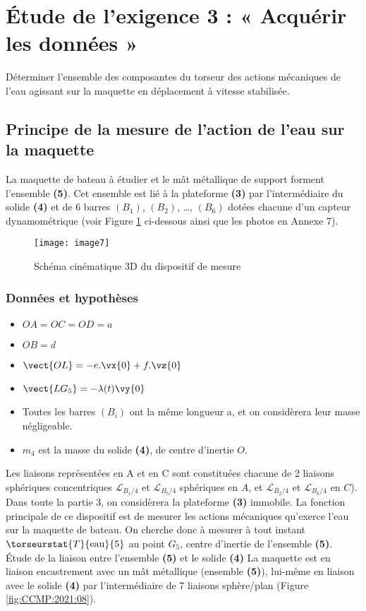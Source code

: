 \section{Étude de l'exigence 3 : « Acquérir les données »}
\begin{obj}
Déterminer l'ensemble des composantes du torseur des actions mécaniques de l'eau agissant sur la maquette en déplacement à vitesse stabilisée.
\end{obj}
\subsection{Principe de la mesure de l’action de l’eau sur la maquette}
La maquette de bateau à étudier et le mât métallique de support forment l’ensemble \textbf{\textbf{(5)}}. Cet ensemble est lié à la plateforme \textbf{(3)} par l’intermédiaire du solide \textbf{(4)} et de 6 barres 
$(B_1)$, $(B_2)$, …, $(B_6)$ dotées chacune d’un capteur dynamométrique (voir Figure \ref{fig:CCMP:2021:07} ci-dessous ainsi que les photos en Annexe 7).
 
\begin{figure}[!h]
\centering
\texttt{[image: image7]}
\caption{ \label{fig:CCMP:2021:07} Schéma cinématique 3D du dispositif de mesure}
\end{figure} 

\subsubsection*{Données et hypothèses}
 \begin{itemize}
 \item $OA=OC=OD=a$
 \item $OB=d$
 \item $\vect{OL}=-e.\vx{0}+f.\vz{0}$
 \item $\vect{LG_5}=-\lambda (t) \vy{0}$
 \item Toutes les barres $(B_i)$ ont la même longueur a, et on considèrera leur masse négligeable.
 \item $m_4$ est la masse du solide \textbf{(4)}, de centre d’inertie $O$.
\end{itemize} 

Les liaisons représentées en A et en C sont constituées chacune de 2 liaisons sphériques concentriques $\mathcal{L}_{B_1/4}$ et $\mathcal{L}_{B_5/4}$ sphériques en $A$, et $\mathcal{L}_{B_2/4}$ et $\mathcal{L}_{B_6/4}$ en $C$).
Dans toute la partie 3, on considèrera la plateforme \textbf{(3)} immobile.
La fonction principale de ce dispositif est de mesurer les actions mécaniques qu’exerce l’eau sur la maquette de bateau. On cherche donc à mesurer à tout instant $\torseurstat{T}{\text{eau}}{5}$ au point $G_5$, centre d’inertie de l’ensemble \textbf{(5)}.
Étude de la liaison entre l’ensemble \textbf{(5)} et le solide \textbf{(4)}
La maquette est en liaison encastrement avec un mât métallique (ensemble \textbf{(5)}), lui-même en liaison avec le solide \textbf{(4)} par l’intermédiaire de 7 liaisons sphère/plan (Figure \ref{fig:CCMP:2021:08}).


